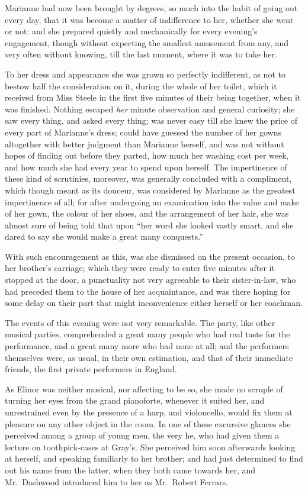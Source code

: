 \documentclass{article}
\begin{document}
Marianne had now been brought by degrees, so much
into the habit of going out every day, that it was become
a matter of indifference to her, whether she went or not:
and she prepared quietly and mechanically for every
evening's engagement, though without expecting the smallest
amusement from any, and very often without knowing,
till the last moment, where it was to take her.

To her dress and appearance she was grown so perfectly
indifferent, as not to bestow half the consideration on it,
during the whole of her toilet, which it received from
Miss Steele in the first five minutes of their being
together, when it was finished.  Nothing escaped \emph{her} minute
observation and general curiosity; she saw every thing,
and asked every thing; was never easy till she knew the price
of every part of Marianne's dress; could have guessed the
number of her gowns altogether with better judgment than
Marianne herself, and was not without hopes of finding out
before they parted, how much her washing cost per week,
and how much she had every year to spend upon herself.
The impertinence of these kind of scrutinies, moreover,
was generally concluded with a compliment, which
though meant as its douceur, was considered by Marianne
as the greatest impertinence of all; for after undergoing
an examination into the value and make of her gown,
the colour of her shoes, and the arrangement of her hair,
she was almost sure of being told that upon ``her word
she looked vastly smart, and she dared to say she would
make a great many conquests.''

With such encouragement as this, was she dismissed
on the present occasion, to her brother's carriage;
which they were ready to enter five minutes after it
stopped at the door, a punctuality not very agreeable
to their sister-in-law, who had preceded them to the house
of her acquaintance, and was there hoping for some delay
on their part that might inconvenience either herself
or her coachman.

The events of this evening were not very remarkable.
The party, like other musical parties, comprehended a
great many people who had real taste for the performance,
and a great many more who had none at all; and the performers
themselves were, as usual, in their own estimation,
and that of their immediate friends, the first private
performers in England.

As Elinor was neither musical, nor affecting to be so,
she made no scruple of turning her eyes from the grand
pianoforte, whenever it suited her, and unrestrained even
by the presence of a harp, and violoncello, would fix
them at pleasure on any other object in the room.  In one
of these excursive glances she perceived among a group
of young men, the very he, who had given them a lecture
on toothpick-cases at Gray's.  She perceived him soon
afterwards looking at herself, and speaking familiarly
to her brother; and had just determined to find out his
name from the latter, when they both came towards her,
and Mr.\ Dashwood introduced him to her as Mr.\ Robert Ferrars.
\end{document}
